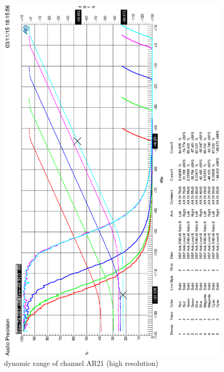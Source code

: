 \documentclass[11pt]{report}
\begin{document}
\begin{appendix}
\begin{figure}[htbp]
\begin{center}
\includegraphics[width=14cm,keepaspectratio=true]{HQTHDAR21dBVergleich}
\caption{dynamic range of channel AR21 (high resolution)}
\label{Abb.:1}
\end{center}
\end{figure}


\end{appendix}
\end{document}
